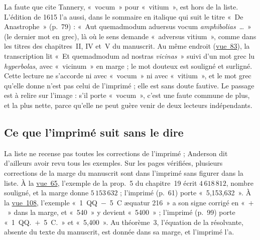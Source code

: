\documentclass[11pt,a4paper]{article}
\theoremstyle{remark}
\newcommand{\vue}[1]{\href{https://gallica.bnf.fr/ark:/12148/btv1b10033620q/f#1.item}{vue~#1}}
\begin{document}
La faute que cite Tannery, «~vocum~» pour «~vitium~», est hors de la
liste. L'édition de 1615 l'a aussi, dans le sommaire en italique qui suit
le titre «~De Anastrophe~» (p.~79) : «~Aut quemadmodum aduersus vocum
\emph{amphibolias}~\dots~» (le dernier mot en grec), là où le sens
demande «~adversus vitium~», comme dans les titres des chapitres~II, IV
et~V du manuscrit. Au même endroit (\vue{83}), la transcription lit
«~Et quemadmodum ad nostras \emph{vicinas}~» suivi d'un mot grec lu
\emph{hyperbolas}, avec «~vicinum~» en marge ; le mot douteux est
souligné et surligné. Cette lecture ne s'accorde ni avec «~vocum~» ni avec
«~vitium~», et le mot grec qu'elle donne n'est pas celui de l'imprimé ;
elle est sans doute fautive. Le passage est à relire sur l'image : s'il
porte «~vocum~», c'est une faute commune de plus, et la plus nette, parce
qu'elle ne peut guère venir de deux lecteurs indépendants.

\subsection{Ce que l'imprimé suit sans le dire}

La liste ne recense pas toutes les corrections de l'imprimé ; Anderson dit
d'ailleurs avoir revu tous les exemples. Sur les pages vérifiées, plusieurs
corrections de la marge du manuscrit sont dans l'imprimé sans figurer dans
la liste. À la \vue{65}, l'exemple de la prop.~5 du chapitre~19 écrit
$4\,618\,812$, nombre souligné, et la marge donne $5\,153\,632$ ; l'imprimé
(p.~61) porte «~5,153,632~». À la \vue{108}, l'exemple
«~1~QQ~$-$~5~C æquatur 216~» a son signe corrigé en «~$+$~» dans la marge, et
«~540~» y devient «~5400~» ; l'imprimé (p.~99) porte «~1~QQ.~$+$~5~C.~» et
«~5,400~». Au théorème~3, l'équation de la résolvante, absente du texte du
manuscrit, est donnée dans sa marge, et l'imprimé l'a.
\end{document}
